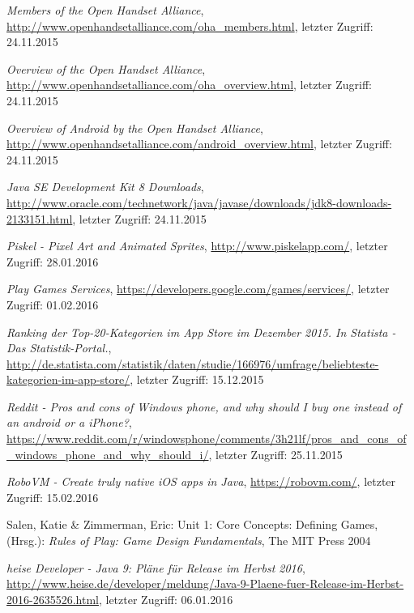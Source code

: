 \begin{thebibliography}{}
\emph{Members of the Open Handset Alliance},
\url{http://www.openhandsetalliance.com/oha_members.html}, letzter Zugriff: 24.11.2015

\emph{Overview of the Open Handset Alliance},
\url{http://www.openhandsetalliance.com/oha_overview.html}, letzter Zugriff: 24.11.2015

\emph{Overview of Android by the Open Handset Alliance},
\url{http://www.openhandsetalliance.com/android_overview.html}, letzter Zugriff: 24.11.2015

\emph{Java SE Development Kit 8 Downloads},
\url{http://www.oracle.com/technetwork/java/javase/downloads/jdk8-downloads-2133151.html}, letzter Zugriff: 24.11.2015

\emph{Piskel - Pixel Art and Animated Sprites},
\url{http://www.piskelapp.com/}, letzter Zugriff: 28.01.2016

\emph{Play Games Services},
\url{https://developers.google.com/games/services/}, letzter Zugriff: 01.02.2016

\emph{Ranking der Top-20-Kategorien im App Store im Dezember 2015. In Statista - Das Statistik-Portal.},
\url{http://de.statista.com/statistik/daten/studie/166976/umfrage/beliebteste-kategorien-im-app-store/}, letzter Zugriff: 15.12.2015

\emph{Reddit - Pros and cons of Windows phone, and why should I buy one instead of an android or a iPhone?},
\url{https://www.reddit.com/r/windowsphone/comments/3h21lf/pros_and_cons_of_windows_phone_and_why_should_i/}, letzter Zugriff: 25.11.2015

\emph{RoboVM - Create truly native iOS apps in Java},
\url{https://robovm.com/}, letzter Zugriff: 15.02.2016

Salen, Katie \& Zimmerman, Eric: 
\glqq Unit 1: Core Concepts: Defining Games\grqq, 
(Hrsg.): \emph{Rules of Play: Game Design Fundamentals}, The MIT Press 2004

\emph{heise Developer - Java 9: Pläne für Release im Herbst 2016},
\url{http://www.heise.de/developer/meldung/Java-9-Plaene-fuer-Release-im-Herbst-2016-2635526.html}, letzter Zugriff: 06.01.2016


\end{thebibliography}
